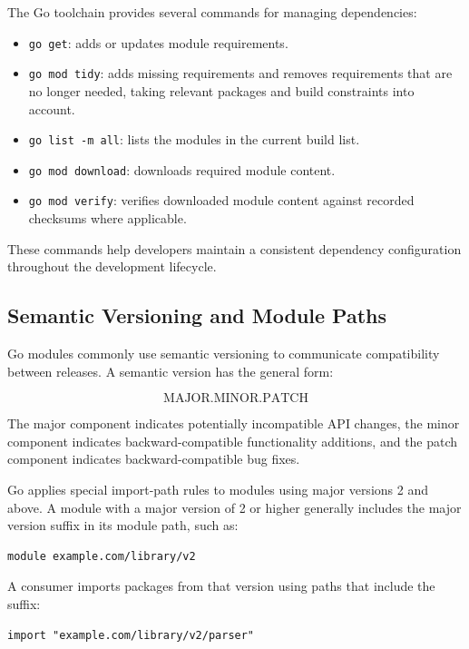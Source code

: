 The Go toolchain provides several commands for managing dependencies:

\begin{itemize}
    \item \texttt{go get}: adds or updates module requirements.
    \item \texttt{go mod tidy}: adds missing requirements and removes requirements that are no longer needed, taking relevant packages and build constraints into account.
    \item \texttt{go list -m all}: lists the modules in the current build list.
    \item \texttt{go mod download}: downloads required module content.
    \item \texttt{go mod verify}: verifies downloaded module content against recorded checksums where applicable.
\end{itemize}

These commands help developers maintain a consistent dependency configuration throughout the development lifecycle.

\subsection{Semantic Versioning and Module Paths}

Go modules commonly use semantic versioning to communicate compatibility between releases. A semantic version has the general form:

\[
\text{MAJOR.MINOR.PATCH}
\]

The major component indicates potentially incompatible API changes, the minor component indicates backward-compatible functionality additions, and the patch component indicates backward-compatible bug fixes.

Go applies special import-path rules to modules using major versions 2 and above. A module with a major version of 2 or higher generally includes the major version suffix in its module path, such as:

\begin{lstlisting}
module example.com/library/v2
\end{lstlisting}

A consumer imports packages from that version using paths that include the suffix:

\begin{lstlisting}
import "example.com/library/v2/parser"
\end{lstlisting}

